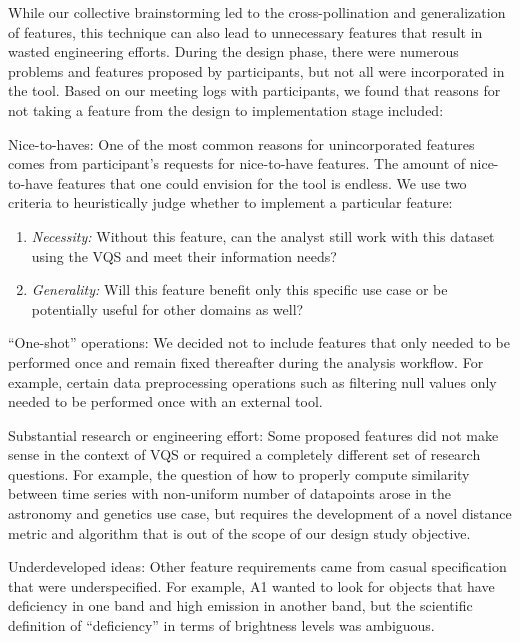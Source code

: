 {  %
  \par While our collective brainstorming led to the cross-pollination and generalization of features, this technique can also lead to unnecessary features that result in wasted engineering efforts. During the design phase, there were numerous problems and features proposed by participants, but not all were incorporated in the tool. Based on our meeting logs with participants, we found that reasons for not taking a feature from the design to implementation stage included:
  \begin{denselist}
  \item Nice-to-haves: One of the most common reasons for unincorporated features comes from participant's requests for nice-to-have features. The amount of nice-to-have features that one could envision for the tool is endless. We use
  two criteria to heuristically judge whether to implement a particular feature:
  \begin{enumerate}[leftmargin=*]
  \item \textit{Necessity:} Without this feature, can the analyst still work with this dataset using the VQS and meet their information needs?
  \item \textit{Generality:} Will this feature benefit only this specific use case or be potentially useful for other domains as well?
  \end{enumerate}
  \item ``One-shot'' operations: We decided not to include features that only needed to be performed once and remain fixed thereafter during the analysis workflow. For example, certain data preprocessing operations such as filtering null values only needed to be performed once with an external tool.
  \item Substantial research or engineering effort: Some proposed features did not make sense in the context of VQS or required a completely different set of research questions. For example, the question of how to properly compute similarity between time series with non-uniform number of datapoints arose in the astronomy and genetics use case, but requires the development of a novel distance metric and algorithm that is out of the scope of our design study objective. %
  
  \item Underdeveloped ideas: Other feature requirements came from casual specification that were underspecified. For example, A1 wanted to look for objects that have deficiency in one band and high emission in another band, but the scientific definition of ``deficiency'' in terms of brightness levels was ambiguous.

\end{denselist}}
